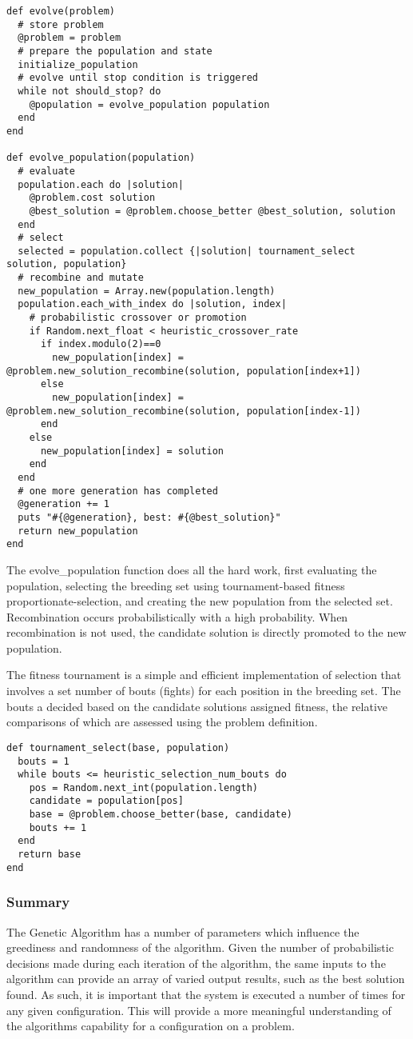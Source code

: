 \begin{lstlisting}
def evolve(problem)
  # store problem
  @problem = problem
  # prepare the population and state
  initialize_population
  # evolve until stop condition is triggered
  while not should_stop? do
    @population = evolve_population population
  end
end

def evolve_population(population)
  # evaluate
  population.each do |solution| 
    @problem.cost solution 
    @best_solution = @problem.choose_better @best_solution, solution
  end
  # select
  selected = population.collect {|solution| tournament_select solution, population}
  # recombine and mutate
  new_population = Array.new(population.length)
  population.each_with_index do |solution, index|
    # probabilistic crossover or promotion
    if Random.next_float < heuristic_crossover_rate        
      if index.modulo(2)==0
        new_population[index] = @problem.new_solution_recombine(solution, population[index+1])
      else
        new_population[index] = @problem.new_solution_recombine(solution, population[index-1])
      end
    else
      new_population[index] = solution
    end
  end
  # one more generation has completed
  @generation += 1
  puts "#{@generation}, best: #{@best_solution}"    
  return new_population
end
\end{lstlisting}

The evolve\_population function does all the hard work, first evaluating the population, selecting the breeding set using tournament-based fitness proportionate-selection, and creating the new population from the selected set. Recombination occurs probabilistically with a high probability. When recombination is not used, the candidate solution is directly promoted to the new population.

The fitness tournament is a simple and efficient implementation of selection that involves a set number of bouts (fights) for each position in the breeding set. The bouts a decided based on the candidate solutions assigned fitness, the relative comparisons of which are assessed using the problem definition.

\begin{lstlisting}
def tournament_select(base, population)
  bouts = 1
  while bouts <= heuristic_selection_num_bouts do
    pos = Random.next_int(population.length)
    candidate = population[pos]
    base = @problem.choose_better(base, candidate)
    bouts += 1
  end
  return base
end
\end{lstlisting}

\subsubsection{Summary}
The Genetic Algorithm has a number of parameters which influence the greediness and randomness of the algorithm. Given the number of probabilistic decisions made during each iteration of the algorithm, the same inputs to the algorithm can provide an array of varied output results, such as the best solution found. As such, it is important that the system is executed a number of times for any given configuration. This will provide a more meaningful understanding of the algorithms capability for a configuration on a problem.


